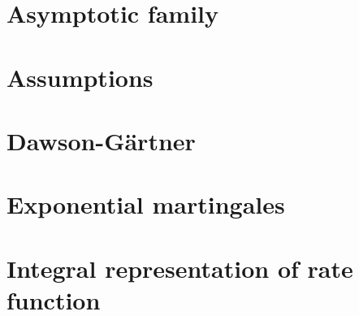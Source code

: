 

\section{Asymptotic family}
\label{large-deviations:asymptotics}


\section{Assumptions}
\label{large-deviations:assumptions}


\section{Dawson-G\"artner}
\label{large-deviations:dawson-gaertner}


\section{Exponential martingales}
\label{large-deviations:exponential-martingales}


\section{Integral representation of rate function}
\label{large-deviations:rate-function}

